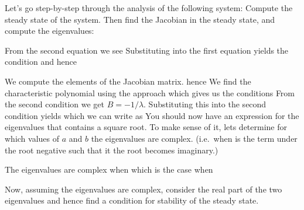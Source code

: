 
\label{exComplexComplex}
Let's go step-by-step through the analysis of the following system:
\subquestion
Compute the steady state of the system. Then find the Jacobian in the steady state, and compute the eigenvalues:

\solution
From the second equation we see 
Substituting into the first equation yields the condition
and hence 

We compute the elements of the Jacobian matrix.
hence
We find the characteristic polynomial using the approach 
which gives us the conditions 
From the second condition we get $B=-1/\lambda$. Substituting this into the second condition yields 
which we can write as 
\subquestion 
You should now have an expression for the eigenvalues that contains a square root. To make sense of it, lets determine for which values of $a$ and $b$ the eigenvalues are complex. (i.e.~when is the term under the root negative such that it the root becomes imaginary.)

\solution
The eigenvalues are complex when
which is the case when 

\subquestion
Now, assuming the eigenvalues are complex, consider the real part of the two eigenvalues and hence find a condition for stability of the steady state. 

